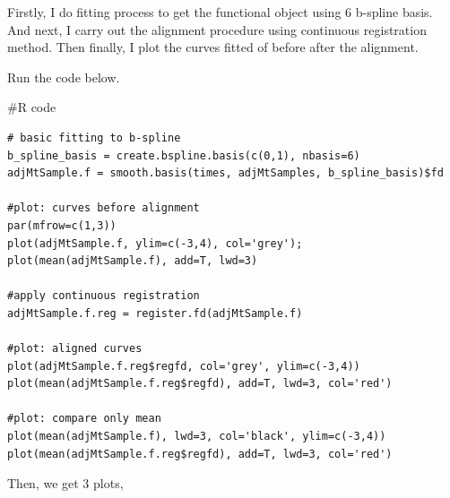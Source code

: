 \documentclass{article}
\newenvironment{Rcode}%
{%
    \begin{mdframed}
    \#R code
    \begin{small}
}
{%
    \end{small}
    \end{mdframed}
}
\begin{document}
Firstly, I do fitting process to get the functional object using 6 b-spline basis.
And next, I carry out the alignment procedure using continuous registration method.
Then finally, I plot the curves fitted of before \/ after the alignment.

Run the code below.
\begin{Rcode}
    \begin{verbatim}
# basic fitting to b-spline
b_spline_basis = create.bspline.basis(c(0,1), nbasis=6)
adjMtSample.f = smooth.basis(times, adjMtSamples, b_spline_basis)$fd

#plot: curves before alignment
par(mfrow=c(1,3))
plot(adjMtSample.f, ylim=c(-3,4), col='grey'); plot(mean(adjMtSample.f), add=T, lwd=3)

#apply continuous registration
adjMtSample.f.reg = register.fd(adjMtSample.f)

#plot: aligned curves
plot(adjMtSample.f.reg$regfd, col='grey', ylim=c(-3,4))
plot(mean(adjMtSample.f.reg$regfd), add=T, lwd=3, col='red')

#plot: compare only mean
plot(mean(adjMtSample.f), lwd=3, col='black', ylim=c(-3,4))
plot(mean(adjMtSample.f.reg$regfd), add=T, lwd=3, col='red')
    \end{verbatim}
\end{Rcode}

\newpage
Then, we get 3 plots,
\end{document}
